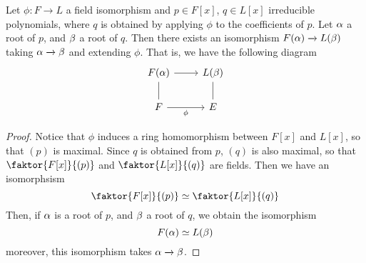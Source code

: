 \begin{theorem}\label{1.1.9}
    Let $\phi:F \xrightarrow{} L$ a field isomorphism and $p \in F[x]$, $q \in
    L[x]$ irreducible polynomials, where $q$ is obtained by applying  $\phi$ to
    the coefficients of $p$. Let  $\alpha$ a root of  $p$, and  $\beta$ a root of $q$.
    Then there exists an isomorphism $F(\alpha) \xrightarrow{} L(\beta)$ taking $\alpha
    \xrightarrow{} \beta$ and extending $\phi$. That is, we have the following
    diagram
    \[\begin{tikzcd}
        {F(\alpha)} & {L(\beta)} \\
        F & E
        \arrow[no head, from=1-1, to=2-1]
        \arrow[no head, from=1-2, to=2-2]
        \arrow[from=1-1, to=1-2]
        \arrow["\phi"', from=2-1, to=2-2]
    \end{tikzcd}\]
\end{theorem}
\begin{proof}
    Notice that $\phi$ induces a ring homomorphism between  $F[x]$ and $L[x]$,
    so that $(p)$ is maximal. Since $q$ is obtained from $p$,  $(q)$ is also
    maximal, so that $\faktor{F[x]}{(p)}$ and $\faktor{L[x]}{(q)}$ are fields.
    Then we have an isomorphsism
    \begin{equation*}
        \faktor{F[x]}{(p)} \simeq \faktor{L[x]}{(q)}
    \end{equation*}
    Then, if $\alpha$ is a root of $p$, and $\beta$ a root of $q$, we obtain the
    isomorphism
    \begin{equation*}
        F(\alpha) \simeq L(\beta)
    \end{equation*}
    moreover, this isomorphism takes $\alpha \xrightarrow{} \beta$.
\end{proof}

